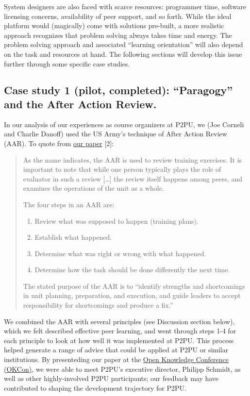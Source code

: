 System designers are also faced with scarce resources: programmer time,
software licensing concerns, availability of peer support, and so forth.
While the ideal platform would (magically) come with solutions
pre-built, a more realistic approach recognizes that problem solving
always takes time and energy. The problem solving approach and
associated ``learning orientation'' will also depend on the task and
resources at hand. The following sections will develop this issue
further through some specific case studies.

\subsection{Case study 1 (pilot, completed): ``Paragogy'' and the
After Action Review.}

In our analysis of our experiences as course organizers at P2PU, we (Joe
Corneli and Charlie Danoff) used the US Army's technique of After Action
Review (AAR). To quote from
\href{http://paragogy.net/ParagogyPaper2}{our paper} {[}2{]}:

\begin{quote}
As the name indicates, the AAR is used to review training exercises. It
is important to note that while one person typically plays the role of
evaluator in such a review {[}\ldots{}{]} the review itself happens
among peers, and examines the operations of the unit as a whole.

The four steps in an AAR are:

\begin{enumerate}
\item
  Review what was supposed to happen (training plans).
\item
  Establish what happened.
\item
  Determine what was right or wrong with what happened.
\item
  Determine how the task should be done differently the next time.
\end{enumerate}
The stated purpose of the AAR is to ``identify strengths and
shortcomings in unit planning, preparation, and execution, and guide
leaders to accept responsibility for shortcomings and produce a fix.''

\end{quote}
We combined the AAR with several principles (see Discussion section
below), which we felt described effective peer learning, and went
through steps 1-4 for each principle to look at how well it was
implemented at P2PU. This process helped generate a range of advice that
could be applied at P2PU or similar institutions. By presenteding our
paper at the \href{http://okfn.org/okcon/}{Open Knowledge Conference
(OKCon)}, we were able to meet P2PU's executive director, Philipp
Schmidt, as well as other highly-involved P2PU participants; our
feedback may have contributed to shaping the development trajectory for
P2PU.

